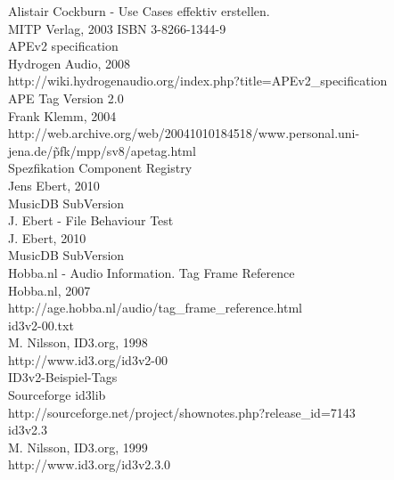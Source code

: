 \begin{thebibliography}{9999999999999}

	 Alistair Cockburn - Use Cases effektiv erstellen.\\
	MITP Verlag, 2003 ISBN 3-8266-1344-9\\

	 APEv2 specification\\
	Hydrogen Audio, 2008\\
	http://wiki.hydrogenaudio.org/index.php?title=APEv2\_specification\\

	 APE Tag Version 2.0\\
	Frank Klemm, 2004\\
	http://web.archive.org/web/20041010184518/www.personal.uni-jena.de/\~pfk/mpp/sv8/apetag.html\\

	 Spezfikation Component Registry\\
	Jens Ebert, 2010\\
	MusicDB SubVersion\\

	 J. Ebert - File Behaviour Test\\
	J. Ebert, 2010\\
	MusicDB SubVersion\\

	 Hobba.nl - Audio Information. Tag Frame Reference\\
	Hobba.nl, 2007\\
	http://age.hobba.nl/audio/tag\_frame\_reference.html\\

	 id3v2-00.txt\\
	M. Nilsson, ID3.org, 1998\\
	http://www.id3.org/id3v2-00\\

	 ID3v2-Beispiel-Tags \\
	Sourceforge id3lib\\
	http://sourceforge.net/project/shownotes.php?release\_id=7143\\
	
	 id3v2.3\\
	M. Nilsson, ID3.org, 1999\\
	http://www.id3.org/id3v2.3.0\\
	

\end{thebibliography}
